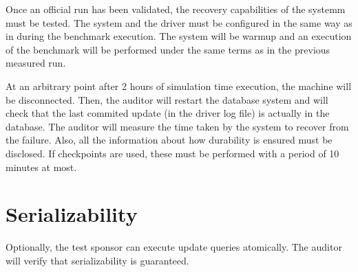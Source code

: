 Once an official run has been validated, the recovery capabilities of the
systemm must be tested. The system and the driver must be configured in the
same way as in during the benchmark execution. The system will be warmup and an
execution of the benchmark will be performed under the same terms as in the
previous measured run.

At an arbitrary point after 2 hours of simulation time execution, the machine
will be disconnected.  Then, the auditor will restart the database system and
will check that the last commited update (in the driver log file) is actually
in the database. The auditor will measure the time taken by the system to
recover from the failure. Also, all the information about how durability is 
ensured must be disclosed. If checkpoints are used, these must be performed 
with a period of 10 minutes at most.


\section{Serializability}

Optionally, the test sponsor can execute update queries atomically. The auditor
will verify that serializability is guaranteed. 

